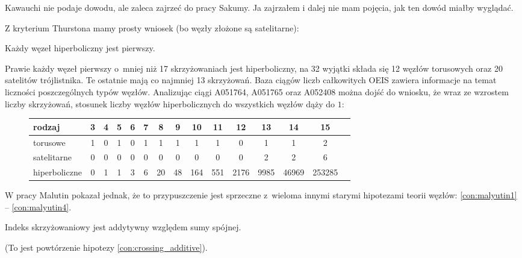 Kawauchi nie podaje dowodu, ale zaleca zajrzeć do pracy Sakumy.
Ja zajrzałem i dalej nie mam pojęcia, jak ten dowód miałby wyglądać.

Z kryterium Thurstona mamy prosty wniosek (bo węzły złożone są satelitarne):

\begin{corollary}
    Każdy węzeł hiperboliczny jest pierwszy.
\end{corollary}

Prawie każdy węzeł pierwszy o~mniej niż 17 skrzyżowaniach jest hiperboliczny, na 32 wyjątki składa się 12 węzłów torusowych oraz 20 satelitów trójlistnika.
Te ostatnie mają co najmniej 13 skrzyżowań.
Baza ciągów liczb całkowitych OEIS zawiera informacje na temat liczności poszczególnych typów węzłów.
Analizując ciągi A051764, A051765 oraz A052408 można dojść do wniosku, że wraz ze wzrostem liczby skrzyżowań, stosunek liczby węzłów hiperbolicznych do wszystkich węzłów dąży do $1$:

\begin{figure}[H]
\renewcommand*{\arraystretch}{1.4}
\footnotesize
\begin{longtable}{lcccccccccccccc}
\hline
    \textbf{rodzaj} & 3 & 4 & 5 & 6 & 7 & 8  & 9  & 10  & 11  & 12   & 13   & 14    & 15     \\ \hline \endhead
    torusowe        & 1 & 0 & 1 & 0 & 1 & 1  & 1  & 1   & 1   & 0    & 1    & 1     & 2      \\
    satelitarne     & 0 & 0 & 0 & 0 & 0 & 0  & 0  & 0   & 0   & 0    & 2    & 2     & 6      \\
    hiperboliczne   & 0 & 1 & 1 & 3 & 6 & 20 & 48 & 164 & 551 & 2176 & 9985 & 46969 & 253285 \\
    \hline
\end{longtable}
\normalsize
\end{figure}

W pracy \cite{malyutin16} Malutin pokazał jednak, że to przypuszczenie jest sprzeczne z~wieloma innymi starymi hipotezami teorii węzłów: \ref{con:malyutin1} -- \ref{con:malyutin4}.
%

\begin{conjecture}
    \label{con:malyutin1}
    Indeks skrzyżowaniowy jest addytywny względem sumy spójnej.
\end{conjecture}

(To jest powtórzenie hipotezy \ref{con:crossing_additive}).

